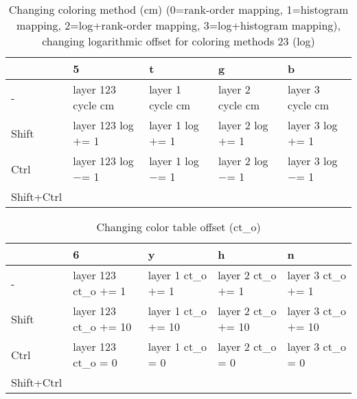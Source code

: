 \documentclass[10pt,a4paper]{article}
\begin{document}
\begin{table}[h!]
    \caption{Changing coloring method (cm) (0=rank-order mapping, 1=histogram mapping, 2=log+rank-order mapping, 3=log+histogram mapping), changing logarithmic offset for coloring methods 23 (log)}
    \setlength{\tabcolsep}{0.0pt}
    \begin{tabularx}{\linewidth}{LLLLL}
        \toprule
                   & 5                    & t                  & g                  & b                  \\
        \midrule                                                                          
        -          & layer 123 cycle cm   & layer 1 cycle cm   & layer 2 cycle cm   & layer 3 cycle cm   \\
        Shift      & layer 123 log $+$= 1 & layer 1 log $+$= 1 & layer 2 log $+$= 1 & layer 3 log $+$= 1 \\
        Ctrl       & layer 123 log $-$= 1 & layer 1 log $-$= 1 & layer 2 log $-$= 1 & layer 3 log $-$= 1 \\
        Shift+Ctrl &                      &                    &                    &                    \\
        \bottomrule
    \end{tabularx}
\end{table}

\begin{table}[h!]
    \caption{Changing color table offset (ct\_o)}
    \setlength{\tabcolsep}{0.0pt}
    \begin{tabularx}{\linewidth}{LLLLL}
        \toprule
                   & 6                       & y                     & h                     & n                     \\
        \midrule                                                                          
        -          & layer 123 ct\_o $+$= 1  & layer 1 ct\_o $+$= 1  & layer 2 ct\_o $+$= 1  & layer 3 ct\_o $+$= 1  \\
        Shift      & layer 123 ct\_o $+$= 10 & layer 1 ct\_o $+$= 10 & layer 2 ct\_o $+$= 10 & layer 3 ct\_o $+$= 10 \\
        Ctrl       & layer 123 ct\_o = 0     & layer 1 ct\_o = 0     & layer 2 ct\_o = 0     & layer 3 ct\_o = 0     \\
        Shift+Ctrl &                         &                       &                       &                       \\
        \bottomrule
    \end{tabularx}
\end{table}
\end{document}
